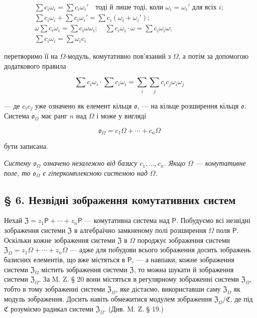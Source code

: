 \documentclass[11pt]{article}
\begin{document}
\[
\begin{array}{l}
\sum c_i\omega_i=\sum c_i\omega_i' \quad\text{тоді й лише тоді, коли } \omega_i=\omega_i' \text{ для всіх } i;\\
\sum c_i\omega_i+\sum c_i\omega_i'=\sum c_i(\omega_i+\omega_i');\\
\omega\sum c_i\omega_i=\sum c_i\omega\omega_i;\quad
\sum c_i\omega_i\cdot\omega=\sum c_i\omega_i\omega;\\
\sum c_i\omega_i=\sum \omega_i c_i
\end{array}
\]

перетворимо її на \(\Omega\)-модуль, комутативно пов'язаний з \(\Omega\), а потім за допомогою додаткового правила

\[
\sum c_i\omega_i\cdot \sum c_i\omega_i
=\sum_i\sum_j c_ic_j\omega_i\omega_j
\]

--- де \(c_ic_j\) уже означено як елемент кільця \(\mathfrak{o}\), --- на кільце розширення кільця \(\mathfrak{o}\). Система \(\mathfrak{o}_{\Omega}\) має ранг \(n\) над \(\Omega\) і може у вигляді

\[
\mathfrak{o}_{\Omega}=c_1\Omega+\cdots+c_n\Omega
\]

бути записана.

\emph{Систему \(\mathfrak{o}_{\Omega}\) означено незалежно від базису \(c_1,\ldots,c_n\). Якщо \(\Omega\) --- комутативне поле, то \(\mathfrak{o}_{\Omega}\) є гіперкомплексною системою над \(\Omega\).}

\subsection*{§ 6. Незвідні зображення комутативних систем}\label{die-irreduziblen-darstellungen-kommutativer-systeme}

Нехай \(\mathfrak Z=z_1\mathsf P+\cdots+z_n\mathsf P\) --- комутативна система над \(\mathsf P\). Побудуємо всі незвідні зображення системи \(\mathfrak Z\) в алгебраїчно замкненому полі розширення \(\Omega\) поля \(\mathsf P\). Оскільки кожне зображення системи \(\mathfrak Z\) в \(\Omega\) породжує зображення системи \(\mathfrak Z_\Omega=z_1\Omega+\cdots+z_n\Omega\) --- адже для побудови всього зображення досить зображень базисних елементів, що вже містяться в \(\mathsf P\), --- а навпаки, кожне зображення системи \(\mathfrak Z_\Omega\) містить зображення системи \(\mathfrak Z\), то можна шукати й зображення системи \(\mathfrak Z_\Omega\). За M. Z. § 20 вони містяться в регулярному зображенні системи \(\mathfrak Z_\Omega\), тобто в тому зображенні системи \(\mathfrak Z_\Omega\), яке дістаємо, використавши саму \(\mathfrak Z_\Omega\) як модуль зображення. Досить навіть обмежитися модулем зображення \(\mathfrak Z_\Omega/\mathfrak C\), де під \(\mathfrak C\) розуміємо радикал системи \(\mathfrak Z_\Omega\). (Див. M. Z. § 19.)
\end{document}
